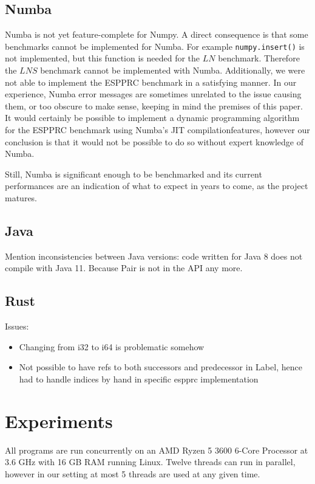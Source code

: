\documentclass[11pt,a4paper,notitlepage]{article}
\begin{document}
\subsection{Numba}
Numba is not yet feature-complete for Numpy. A direct consequence is that some
benchmarks cannot be implemented for Numba. For example
\lstinline{numpy.insert()} is not implemented, but this function is
needed for the $LN$ benchmark. Therefore the $LNS$ benchmark cannot be
implemented with Numba. Additionally, we were not able to implement
the ESPPRC benchmark in a satisfying manner. In our experience, Numba
error messages are sometimes unrelated to the issue causing them, or
too obscure to make sense, keeping in mind the premises of this
paper. It would certainly be possible to implement a dynamic
programming algorithm for the ESPPRC benchmark using Numba's JIT
compilationfeatures, however our conclusion is that it would not be
possible to do so without expert knowledge of Numba.

Still, Numba is significant enough to be
benchmarked and its current performances are an indication of what to
expect in years to come, as the project matures.

\subsection{Java}
Mention inconsistencies between Java versions: code written for Java 8
does not compile with Java 11. Because Pair is not in the API any
more.

\subsection{Rust}
Issues:
\begin{itemize}
\item Changing from i32 to i64 is problematic somehow
\item Not possible to have refs to both successors and predecessor in
  Label, hence had to handle indices by hand in specific espprc implementation
\end{itemize}

\section{Experiments}
All programs are run concurrently on an AMD Ryzen 5 3600 6-Core
Processor at 3.6 GHz with 16 GB RAM running Linux. Twelve threads can
run in parallel, however in our setting at most 5 threads are used at
any given time.
\end{document}
